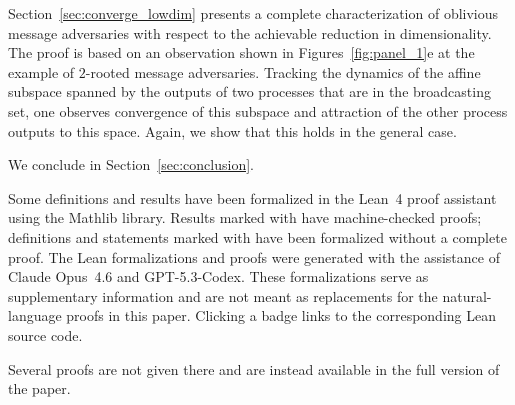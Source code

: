 \documentclass[a4paper,USenglish]{lipics-v2021}
\begin{document}
Section~\ref{sec:converge_lowdim} presents a complete characterization of oblivious message adversaries with respect to the achievable reduction in dimensionality.
The proof is based on an observation shown in Figures~\ref{fig:panel_1}e at the example of $2$-rooted message adversaries.
Tracking the dynamics of the affine subspace spanned by the outputs of two processes that are in the broadcasting set, one observes convergence of this subspace and attraction of the other process outputs to this space.
Again, we show that this holds in the general case.

We conclude in Section~\ref{sec:conclusion}.

Some definitions and results have been formalized in the Lean~4 proof assistant~\cite{lean4} using the Mathlib library.
Results marked with \leanproof{} have machine-checked proofs; definitions and statements marked with \leanformalized{} have been formalized without a complete proof.
The Lean formalizations and proofs were generated with the assistance of Claude Opus~4.6 and GPT-5.3-Codex.
These formalizations serve as supplementary information and are not meant as replacements for the natural-language proofs in this paper.
Clicking a badge links to the corresponding Lean source code.

Several proofs are not given there and are instead available in the full version of the paper.
\end{document}
